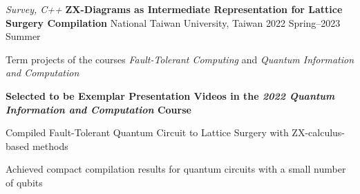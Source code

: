 \begin{cventries}
    

    \cventry
        {\emph{Survey, C++}} %
        {\textbf{ZX-Diagrams as Intermediate Representation for Lattice Surgery Compilation}} %
        {National Taiwan University, Taiwan} %
        {2022 Spring--2023 Summer} %
        {
          \begin{cvitems} %
            \item Term projects of the courses \emph{Fault-Tolerant Computing} and \emph{Quantum Information and Computation}
            \item \textcolor{awesome}{\textbf{Selected to be Exemplar Presentation Videos in the \emph{2022 Quantum Information and Computation} Course}}
            \item Compiled Fault-Tolerant Quantum Circuit to Lattice Surgery with ZX-calculus-based methods
            \item Achieved compact compilation results for quantum circuits with a small number of qubits
          \end{cvitems}
        }
\end{cventries}